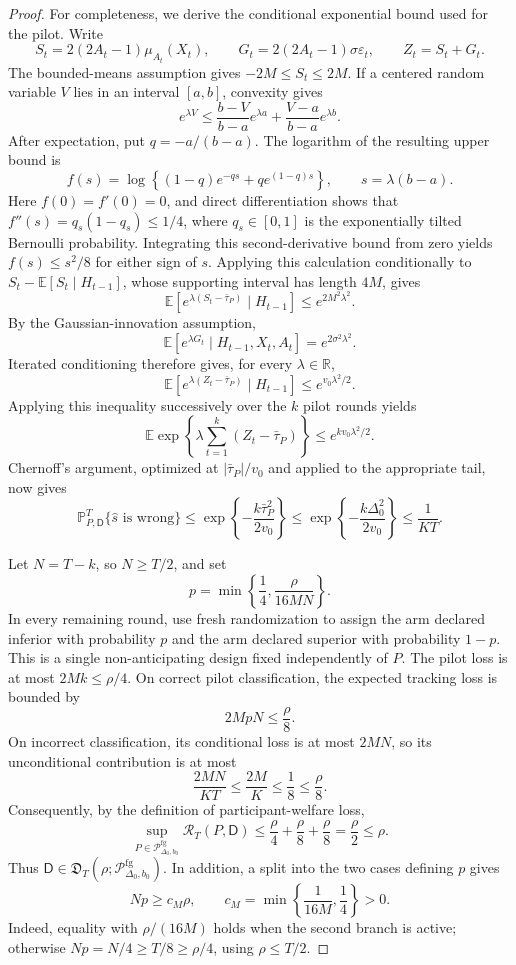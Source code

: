 \documentclass{article}
\begin{document}
\begin{proof}
For completeness, we derive the conditional exponential bound used for the
pilot.  Write
\[
 S_t=2(2A_t-1)\mu_{A_t}(X_t),\qquad
 G_t=2(2A_t-1)\sigma\varepsilon_t,\qquad Z_t=S_t+G_t.
\]
The bounded-means assumption gives \(-2M\leq S_t\leq2M\).  If a centered
random variable \(V\) lies in an interval \([a,b]\), convexity gives
\[
 e^{\lambda V}
 \leq\frac{b-V}{b-a}e^{\lambda a}
     +\frac{V-a}{b-a}e^{\lambda b}.
\]
After expectation, put \(q=-a/(b-a)\).  The logarithm of the resulting upper
bound is
\[
 f(s)=\log\left\{(1-q)e^{-qs}+q e^{(1-q)s}\right\},
 \qquad s=\lambda(b-a).
\]
Here \(f(0)=f'(0)=0\), and direct differentiation shows that
\(f''(s)=q_s(1-q_s)\leq1/4\), where \(q_s\in[0,1]\) is the exponentially
tilted Bernoulli probability.  Integrating this second-derivative bound from
zero yields \(f(s)\leq s^2/8\) for either sign of \(s\).  Applying this
calculation conditionally to
\(S_t-\mathbb E[S_t\mid H_{t-1}]\), whose supporting interval has length
\(4M\), gives
\[
 \mathbb E\left[
 e^{\lambda(S_t-\bar\tau_P)}\mid H_{t-1}
 \right]\leq e^{2M^2\lambda^2}.
\]
By the Gaussian-innovation assumption,
\[
 \mathbb E[e^{\lambda G_t}\mid H_{t-1},X_t,A_t]
 =e^{2\sigma^2\lambda^2}.
\]
Iterated conditioning therefore gives, for every \(\lambda\in\mathbb R\),
\[
 \mathbb E\left[
 e^{\lambda(Z_t-\bar\tau_P)}\mid H_{t-1}
 \right]
 \leq e^{v_0\lambda^2/2}.
\]
Applying this inequality successively over the \(k\) pilot rounds yields
\[
 \mathbb E\exp\left\{
 \lambda\sum_{t=1}^k(Z_t-\bar\tau_P)
 \right\}
 \leq e^{kv_0\lambda^2/2}.
\]
Chernoff's argument, optimized at
\(|\bar\tau_P|/v_0\) and applied to the appropriate tail, now gives
\[
 \mathbb P_{P,\mathsf D}^{T}\{\widehat s\text{ is wrong}\}
 \leq
 \exp\left\{-\frac{k\bar\tau_P^2}{2v_0}\right\}
 \leq
 \exp\left\{-\frac{k\Delta_0^2}{2v_0}\right\}
 \leq\frac{1}{KT}.
\]

Let \(N=T-k\), so \(N\geq T/2\), and set
\[
 p=\min\left\{\frac14,\frac{\rho}{16MN}\right\}.
\]
In every remaining round, use fresh randomization to assign the arm declared
inferior with probability \(p\) and the arm declared superior with probability
\(1-p\).  This is a single non-anticipating design fixed independently of
\(P\).  The pilot loss is at most \(2Mk\leq\rho/4\).  On correct pilot
classification, the expected tracking loss is bounded by
\[
 2MpN\leq\frac\rho8.
\]
On incorrect classification, its conditional loss is at most \(2MN\), so its
unconditional contribution is at most
\[
 \frac{2MN}{KT}\leq\frac{2M}{K}\leq\frac18\leq\frac\rho8.
\]
Consequently, by the definition of participant-welfare loss,
\[
 \sup_{P\in\mathcal P_{\Delta_0,b_0}^{\mathrm{fg}}}
 \mathcal R_T(P,\mathsf D)
 \leq\frac\rho4+\frac\rho8+\frac\rho8
 =\frac\rho2\leq\rho.
\]
Thus \(\mathsf D\in\mathfrak D_T(\rho;
\mathcal P_{\Delta_0,b_0}^{\mathrm{fg}})\).  In addition, a split into the
two cases defining \(p\) gives
\[
 Np\geq c_M\rho,
 \qquad
 c_M=\min\left\{\frac{1}{16M},\frac14\right\}>0.
\]
Indeed, equality with \(\rho/(16M)\) holds when the second branch is active;
otherwise \(Np=N/4\geq T/8\geq\rho/4\), using
\(\rho\leq T/2\).


\end{proof}
\end{document}
